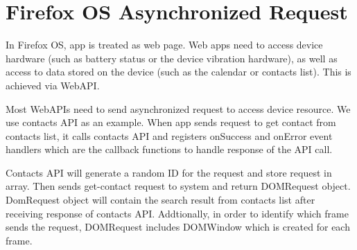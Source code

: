 \documentclass[12pt]{article}
\begin{document}
\section*{Firefox OS Asynchronized Request}
In Firefox OS, app is treated as web page. Web apps need to access device hardware (such as battery status or the device vibration hardware), as well as access to data stored on the device (such as the calendar or contacts list). This is achieved via WebAPI. %

Most WebAPIs need to send asynchronized request to access device resource. We use contacts API as an example. When app sends request to get contact from contacts list,  it calls contacts API and registers onSuccess and onError event handlers which are the callback functions to handle response of the API call. %

Contacts API will generate a random ID for the request and store request in array. Then sends get-contact request to system and return DOMRequest object. DomRequest object will contain the search result from contacts list after receiving response of contacts API. Addtionally, in order to identify which frame sends the request, DOMRequest includes DOMWindow which is created for each frame. %



  
\end{document}
